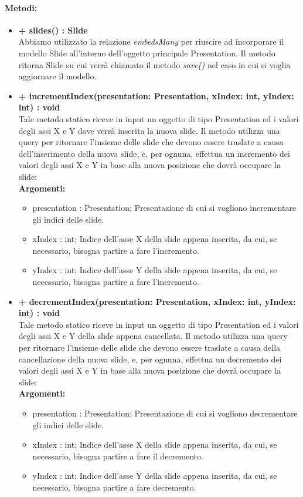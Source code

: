	\paragraph{Metodi:}
	\begin{itemize}
		\item \textbf{+ slides() : Slide}\\
		Abbiamo utilizzato la relazione \textit{embedsMany} per riuscire ad incorporare il modello Slide all’interno dell’oggetto principale Presentation. Il metodo ritorna Slide su cui verrà chiamato il metodo \textit{save()} nel caso in cui si voglia aggiornare il modello.
		\item \textbf{+ incrementIndex(presentation: Presentation, xIndex: int, yIndex: int) : void}\\
		Tale metodo statico riceve in input un oggetto di tipo Presentation ed i valori degli assi X e Y dove verrà inserita la nuova slide. Il metodo utilizza una query per ritornare l'insieme delle slide che devono essere traslate a causa dell'inserimento della nuova slide, e, per ognuna, effettua un incremento dei valori degli assi X e Y in base alla nuova posizione che dovrà occupare la slide:\\
		\textbf{Argomenti:}
		\begin{itemize}
			\item presentation : Presentation;
			Presentazione di cui si vogliono incrementare gli indici delle slide.
			\item xIndex : int;
			Indice dell'asse X della slide appena inserita, da cui, se necessario, bisogna partire a fare l'incremento.
			\item yIndex : int;
			Indice dell'asse Y della slide appena inserita, da cui, se necessario, bisogna partire a fare l'incremento.
		\end{itemize}
		\item \textbf{+ decrementIndex(presentation: Presentation, xIndex: int, yIndex: int) : void}\\
		Tale metodo statico riceve in input un oggetto di tipo Presentation ed i valori degli assi X e Y della slide appena cancellata. Il metodo utilizza una query per ritornare l'insieme delle slide che devono essere traslate a causa della cancellazione della nuova slide, e, per ognuna, effettua un decremento dei valori degli assi X e Y in base alla nuova posizione che dovrà occupare la slide:\\
		\textbf{Argomenti:}
		\begin{itemize}
			\item presentation : Presentation;
			Presentazione di cui si vogliono decrementare gli indici delle slide.
			\item xIndex : int;
			Indice dell'asse X della slide appena inserita, da cui, se necessario, bisogna partire a fare il decremento.
			\item yIndex : int;
			Indice dell'asse Y della slide appena inserita, da cui, se necessario, bisogna partire a fare decremento.
		\end{itemize}
	\end{itemize}
\newpage


